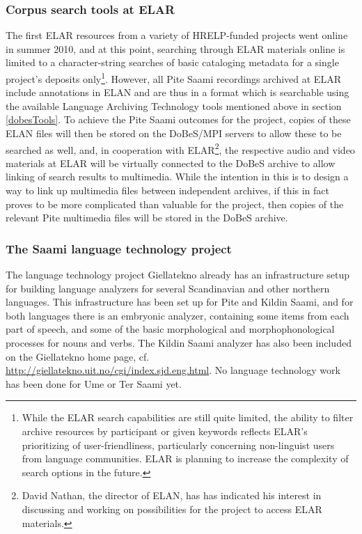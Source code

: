 \documentclass[a4paper,12pt]{article}
\begin{document}
\subsubsection{Corpus search tools at ELAR}\label{elarTools}
The first ELAR resources from a variety of HRELP-funded projects went online in summer 2010, and at this point, searching through ELAR materials online is limited to a character-string searches of basic cataloging metadata for a single project's deposits only\footnote{While the ELAR search capabilities are still quite limited, the ability to filter archive resources by participant or given keywords reflects ELAR's prioritizing of user-friendliness, particularly concerning non-linguist users from language communities. ELAR is planning to increase the complexity of search options in the future.}. However, all Pite Saami recordings archived at ELAR include annotations in ELAN and are thus in a format which is searchable using the available Language Archiving Technology tools mentioned above in section \ref{dobesTools}. To achieve the Pite Saami outcomes for the project, copies of these ELAN files will then be stored on the DoBeS/MPI servers to allow these to be searched as well, and, in cooperation with ELAR\footnote{David Nathan, the director of ELAN, has has indicated his interest in discussing and working on possibilities for the project to access ELAR materials.}, the respective audio and video materials at ELAR will be virtually connected to the DoBeS archive to allow linking of search results to multimedia. While the intention in this is to design a way to link up multimedia files between independent archives, if this in fact proves to be more complicated than valuable for the project, then copies of the relevant Pite multimedia files will be stored in the DoBeS archive.

\subsubsection{The Saami language technology project}

The language technology project Giellatekno %
already has an infrastructure setup for building language analyzers for several Scandinavian and other northern languages. This infrastructure has been set up for Pite and Kildin Saami, and for both languages there is an embryonic analyzer, containing some items from each part of speech, and some of the basic morphological and morphophonological processes for nouns and verbs. The Kildin Saami analyzer has also been included on the Giellatekno home page, cf. \url{http://giellatekno.uit.no/cgi/index.sjd.eng.html}.  No language technology work has been done for Ume or Ter Saami yet.
\end{document}
